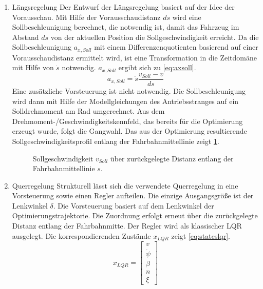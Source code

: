 \documentclass[pdf]{ifacconf}
\begin{document}
\begin{enumerate}
	\item Längsregelung
	Der Entwurf der Längsregelung basiert auf der Idee der Vorausschau. Mit Hilfe der Vorausschaudistanz $ds$ wird eine Sollbeschleunigung berechnet, die notwendig ist, damit das Fahrzeug im Abstand $ds$ von der aktuellen Position die Sollgeschwindigkeit erreicht. Da die Sollbeschleunigung $a_{x,Soll}$ mit einem Differenzenquotienten basierend auf einer Vorausschaudistanz ermittelt wird, ist eine Transformation in die Zeitdomäne mit Hilfe von $\dot{s}$ notwendig. $a_{x,Soll}$ ergibt sich zu \ref{eq:axsoll}.
	\begin{equation}
		a_{x,Soll} = \dot{s} \frac{v_{Soll}-v}{ds}
		\label{eq:axsoll}
	\end{equation}
	Eine zusätzliche Vorsteuerung ist nicht notwendig. Die Sollbeschleunigung wird dann mit Hilfe der Modellgleichungen des Antriebsstranges auf ein Solldrehmoment am Rad umgerechnet. Aus dem Drehmoment-/Geschwindigkeitskennfeld, das bereits für die Optimierung erzeugt wurde, folgt die Gangwahl. Das aus der Optimierung resultierende Sollgeschwindigkeitsprofil entlang der Fahrbahnmittellinie zeigt \ref{fig1}.
	\begin{figure}[h]
		\begin{center}
			\scalebox{0.5}{} %
			\caption{Sollgeschwindigkeit $v_{Soll}$ über zurückgelegte Distanz entlang der Fahrbahnmittellinie $s$.}
			\label{fig1}
		\end{center}
	\end{figure}
	\item Querregelung
	Strukturell lässt sich die verwendete Querregelung in eine Vorsteuerung sowie einen Regler aufteilen. Die einzige Ausgangsgröße ist der Lenkwinkel $\delta$. Die Vorsteuerung basiert auf dem Lenkwinkel der Optimierungstrajektorie. Die Zuordnung erfolgt erneut über die zurückgelegte Distanz entlang der Fahrbahnmitte. Der Regler wird als klassischer LQR ausgelegt. Die korrespondierenden Zustände $x_{LQR}$ zeigt \ref{eq:stateslqr}.
	\begin{equation}
		x_{LQR} = \begin{bmatrix}
		v \\
		\dot{\psi} \\
		\beta \\
		n \\
		\xi 
		\end{bmatrix}
		\label{eq:stateslqr}

\end{equation}
\end{enumerate}
\end{document}
